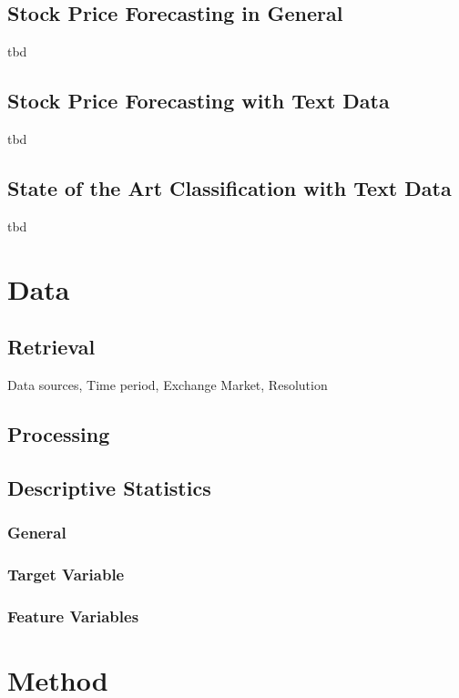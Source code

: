\documentclass{article}
\begin{document}
	\subsection{Stock Price Forecasting in General}
	tbd 
	
	\subsection{Stock Price Forecasting with Text Data}
	tbd
	
	\subsection{State of the Art Classification with Text Data}
	tbd

	\section{Data}
	
	\subsection{Retrieval}
	
	Data sources, Time period, Exchange Market, Resolution
	
	\subsection{Processing}
	
	\subsection{Descriptive Statistics}
	
	\subsubsection{General}
	
	\subsubsection{Target Variable}
	
	\subsubsection{Feature Variables}
	

	\section{Method}
	
\end{document}
